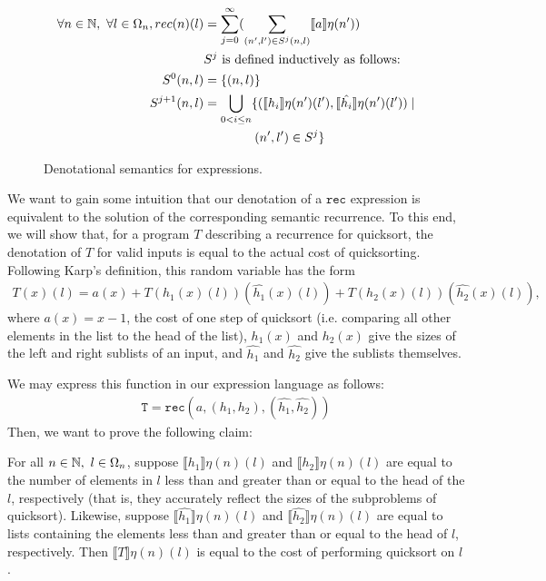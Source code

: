 \begin{figure}
\begin{align*}
  \forall n \in \N, \ 
    \forall l \in \Omega_n, 
    rec(n)(l) &= \sum_{j=0}^{\infty}(\sum_{(n',l') \in S^j(n,l)} \llbracket a \rrbracket\eta(n')) \\
    &S^j \text{ is defined inductively as follows:} \\
    S^0(n,l) &= \{(n, l)\} \\
    S^{j+1}(n,l) &= \bigcup_{0<i \leq n}\{(\llbracket h_i \rrbracket\eta(n')(l') , \llbracket \hat{h_i} \rrbracket\eta(n')(l')) \mid \\
     &\text{ \ \ \ \ \ \ \ \ \ \ \ }(n', l') \in S^j \}
 \end{align*}
 \caption{Denotational semantics for expressions.}
 \end{figure}

We want to gain some intuition that our denotation of a $\texttt{rec}$ expression is equivalent to the solution of
the corresponding semantic recurrence. To this end, we will show that, for a program $T$ describing a recurrence for 
quicksort, the denotation of $T$ for valid inputs is equal to the actual cost of quicksorting. 
 Following Karp's definition, this random variable has the form 
\begin{align*}
T(x)(l) = a(x) + T(h_1(x)(l))(\hat{h_1}(x)(l)) + T(h_2(x)(l))(\hat{h_2}(x)(l)), 
\end{align*}
where $a(x) = x-1$, the cost of one step of quicksort (i.e. comparing all other elements
in the list to the head of the list), $h_1(x)$ and $h_2(x)$ give the sizes of the left and right sublists of an input, and
$\hat{h_1}$ and $\hat{h_2}$ give the sublists themselves. 

We may express this function in our expression language
as follows:
\begin{align*}
\texttt{T} = \texttt{rec}(a, (h_1, h_2), (\hat{h_1}, \hat{h_2}))
\end{align*}
Then, we want to prove the following claim:
\begin{thm}
For all $n \in \mathbb{N}, \ l \in \Omega_n$, suppose $\llbracket h_1 \rrbracket\eta (n)(l)$ and $\llbracket h_2 \rrbracket\eta (n)(l)$
are equal to the number of elements in $l$ less than and greater than or equal to the head of the $l$, respectively (that is,
they accurately reflect the sizes of the subproblems of quicksort). Likewise, suppose
$\llbracket \hat{h_1} \rrbracket\eta (n)(l)$ and $\llbracket \hat{h_2} \rrbracket\eta (n)(l)$ are equal to lists containing the
elements less than and greater than or equal to the head of $l$, respectively. 
 Then $\llbracket T \rrbracket\eta (n)(l)$ is equal to the cost
of performing quicksort on $l$. 
\end{thm} 

